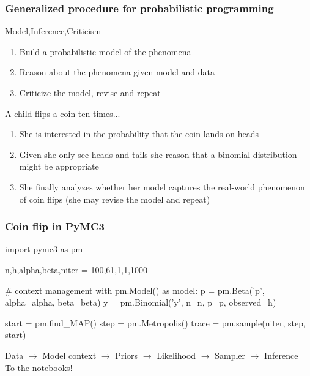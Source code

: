 \documentclass[table,dvipsnames]{beamer}
\begin{document}
\begin{frame}[fragile]
\frametitle{Generalized procedure for probabilistic programming}
\footnotesize
\begin{block}{Model,Inference,Criticism}
\begin{enumerate}
 \item Build a probabilistic model of the phenomena
 \item Reason about the phenomena given model and data
 \item Criticize the model, revise and repeat
\end{enumerate}
\end{block}

A child flips a coin ten times...
\begin{code}
[0, 1, 0, 0, 0, 0, 0, 0, 0, 1]
\end{code}

\begin{enumerate}
 \item She is interested in the probability that the coin lands on heads
 \item Given she only see heads and tails she reason that a binomial distribution might be appropriate
 \item She finally analyzes whether her model captures the real-world phenomenon of coin flips (she may revise the model
and repeat)
\end{enumerate}
\citep{Tran16}
\end{frame}


\begin{frame}[fragile]
\frametitle{Coin flip in PyMC3}
\footnotesize
\begin{code}
import pymc3 as pm

n,h,alpha,beta,niter = 100,61,1,1,1000

# context management
with pm.Model() as model: 
    p = pm.Beta('p', alpha=alpha, beta=beta)
    y = pm.Binomial('y', n=n, p=p, observed=h)

    start = pm.find_MAP()
    step = pm.Metropolis()
    trace = pm.sample(niter, step, start)
\end{code}

Data $\rightarrow$ Model context $\rightarrow$ Priors $\rightarrow$ Likelihood $\rightarrow$ Sampler $\rightarrow$ Inference
\vspace{0.5cm}
\\ \noindent To the notebooks!
\end{frame}
\end{document}
